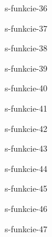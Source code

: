 	\begin{defproblem}{s-funkcie-36}
	
	\end{defproblem}
	
	\begin{defproblem}{s-funkcie-37}
	
	\end{defproblem}
	
	\begin{defproblem}{s-funkcie-38}
	
	\end{defproblem}
	
	\begin{defproblem}{s-funkcie-39}
	
	\end{defproblem}
	
	\begin{defproblem}{s-funkcie-40}
	
	\end{defproblem}
	
	\begin{defproblem}{s-funkcie-41}
	
	\end{defproblem}
	
	\begin{defproblem}{s-funkcie-42}
	
	\end{defproblem}
	
	\begin{defproblem}{s-funkcie-43}
	
	\end{defproblem}
	
	\begin{defproblem}{s-funkcie-44}
	
	\end{defproblem}
	
	\begin{defproblem}{s-funkcie-45}
	
	\end{defproblem}
	
	\begin{defproblem}{s-funkcie-46}
	
	\end{defproblem}
	
	\begin{defproblem}{s-funkcie-47}
	
	\end{defproblem}